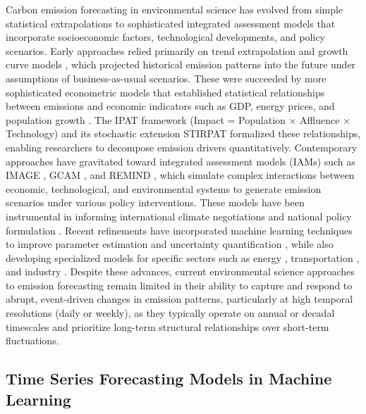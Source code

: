 Carbon emission forecasting in environmental science has evolved from simple statistical extrapolations to sophisticated integrated assessment models that incorporate socioeconomic factors, technological developments, and policy scenarios. Early approaches relied primarily on trend extrapolation and growth curve models \cite{schmalensee1998world}, which projected historical emission patterns into the future under assumptions of business-as-usual scenarios. These were succeeded by more sophisticated econometric models that established statistical relationships between emissions and economic indicators such as GDP, energy prices, and population growth \cite{holtz2018carbon}. The IPAT framework (Impact = Population × Affluence × Technology) and its stochastic extension STIRPAT \cite{york2003stirpat} formalized these relationships, enabling researchers to decompose emission drivers quantitatively. Contemporary approaches have gravitated toward integrated assessment models (IAMs) such as IMAGE \cite{stehfest2014integrated}, GCAM \cite{calvin2019gcam}, and REMIND \cite{luderer2015description}, which simulate complex interactions between economic, technological, and environmental systems to generate emission scenarios under various policy interventions. These models have been instrumental in informing international climate negotiations and national policy formulation \cite{riahi2017shared}. Recent refinements have incorporated machine learning techniques to improve parameter estimation and uncertainty quantification \cite{burandt2018big}, while also developing specialized models for specific sectors such as energy \cite{creutzig2022demand}, transportation \cite{yin2015china}, and industry \cite{karali2020carbon}. Despite these advances, current environmental science approaches to emission forecasting remain limited in their ability to capture and respond to abrupt, event-driven changes in emission patterns, particularly at high temporal resolutions (daily or weekly), as they typically operate on annual or decadal timescales and prioritize long-term structural relationships over short-term fluctuations.

\subsection{Time Series Forecasting Models in Machine Learning}
\label{subsec:time_series_forecasting}

